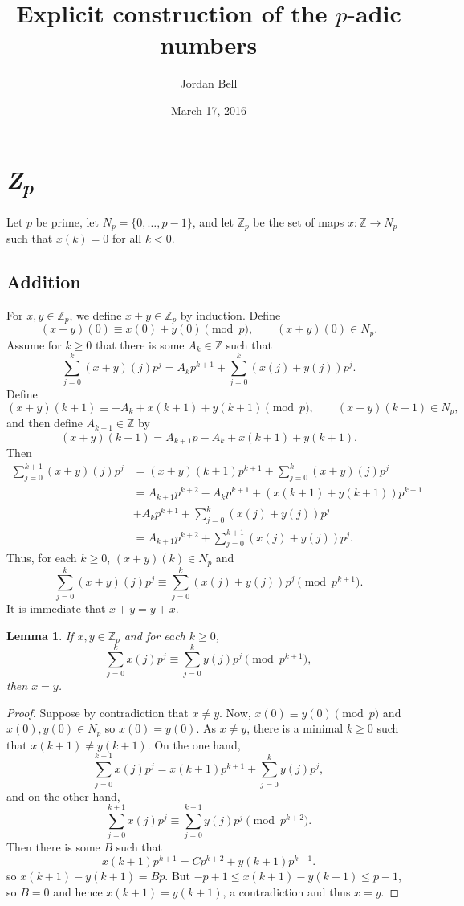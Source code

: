 \documentclass{article}
\newtheorem{lemma}[theorem]{Lemma}
\theoremstyle{definition}
\begin{document}
\title{Explicit construction of the $p$-adic numbers}
\author{Jordan Bell}
\date{March 17, 2016}

\maketitle

\section{{\em \textbf{Z}\textsubscript{p}}}
Let $p$ be prime, let $N_p = \{0,\ldots,p-1\}$, and
let $\mathbb{Z}_p$ be the set of maps $x:\mathbb{Z} \to N_p$ such that $x(k)=0$ for all $k<0$. 




\subsection{Addition}
For $x,y \in \mathbb{Z}_p$,
we define $x+y \in \mathbb{Z}_p$ by induction. Define
\[
(x+y)(0) \equiv x(0)+y(0) \pmod{p}, \qquad (x+y)(0) \in N_p.
\]
Assume  for  $k \geq 0$ that there is some 
$A_k \in \mathbb{Z}$ such that
\[
\sum_{j=0}^k (x+y)(j) p^j = A_k p^{k+1} +  \sum_{j=0}^k (x(j)+y(j))p^j.
\]
Define
\[
(x+y)(k+1) \equiv -A_k + x(k+1)+y(k+1) \pmod{p},\qquad (x+y)(k+1) \in N_p,
\]
and then define
$A_{k+1} \in \mathbb{Z}$ by
\[
(x+y)(k+1)= A_{k+1} p - A_k + x(k+1)+y(k+1).
\] 
Then
\begin{align*}
\sum_{j=0}^{k+1}(x+y)(j) p^j &=(x+y)(k+1) p^{k+1} + \sum_{j=0}^k (x+y)(j) p^j\\
&= A_{k+1} p^{k+2} - A_k p^{k+1} + (x(k+1)+y(k+1))p^{k+1}\\
&+A_k p^{k+1} +  \sum_{j=0}^k (x(j)+y(j))p^j\\
&=A_{k+1} p^{k+2} + \sum_{j=0}^{k+1}  (x(j)+y(j))p^j.
\end{align*}
Thus, for each $k \geq 0$, $(x+y)(k) \in N_p$ and 
\begin{equation}
\sum_{j=0}^k (x+y)(j) p^j \equiv \sum_{j=0}^k (x(j)+y(j)) p^j \pmod{p^{k+1}}.
\label{addition}
\end{equation}
It is immediate that $x+y=y+x$.

\begin{lemma}
If $x,y \in \mathbb{Z}_p$ and for each $k \geq 0$,  
\[
\sum_{j=0}^k x(j) p^j \equiv \sum_{j=0}^k y(j) p^j \pmod{p^{k+1}},
\]
then $x=y$.
\end{lemma}
\begin{proof}
Suppose by contradiction that $x \neq y$. Now, $x(0) \equiv y(0) \pmod{p}$
and $x(0),y(0) \in N_p$ so $x(0)=y(0)$. As $x \neq y$, there is  a minimal $k \geq 0$ such that  
$x(k+1) \neq y(k+1)$. On the one hand, 
\[
\sum_{j=0}^{k+1} x(j) p^j = x(k+1) p^{k+1} + \sum_{j=0}^k y(j) p^j,
\]
and on the other hand,
\[
\sum_{j=0}^{k+1} x(j) p^j  \equiv \sum_{j=0}^{k+1} y(j) p^j \pmod{p^{k+2}}.
\]
Then there is some $B$ such that 
\[
x(k+1)p^{k+1} =Cp^{k+2}+ y(k+1) p^{k+1}.
\]
so $x(k+1) - y(k+1) = Bp$. But $-p+1 \leq x(k+1)-y(k+1) \leq p-1$, so $B=0$ and hence
$x(k+1)=y(k+1)$, a contradiction and thus $x=y$.
\end{proof}
\end{document}
